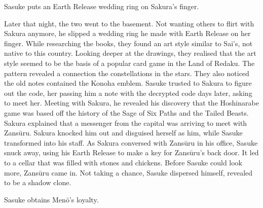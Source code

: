 \documentclass[a4paper,12pt]{article}
\begin{document}
Sasuke puts an Earth Release wedding ring on Sakura's finger.\\ \par \vspace{0.5cm}

Later that night, the two went to the basement. Not wanting others to flirt with Sakura anymore, he slipped a wedding ring he made with Earth Release on her finger. While researching the books, they found an art style similar to Sai's, not native to this country. Looking deeper at the drawings, they realised that the art style seemed to be the basis of a popular card game in the Land of Redaku. The pattern revealed a connection the constellations in the stars. They also noticed the old notes contained the Konoha emblem. Sasuke trusted to Sakura to figure out the code, her passing him a note with the decrypted code days later, asking to meet her. Meeting with Sakura, he revealed his discovery that the Hoshinarabe game was based off the history of the Sage of Six Paths and the Tailed Beasts. Sakura explained that a messenger from the capital was arriving to meet with Zansūru. Sakura knocked him out and disguised herself as him, while Sasuke transformed into his staff. As Sakura conversed with Zansūru in his office, Sasuke snuck away, using his Earth Release to make a key for Zansūru's back door. It led to a cellar that was filled with stones and chickens. Before Sasuke could look more, Zansūru came in. Not taking a chance, Sasuke dispersed himself, revealed to be a shadow clone.\\ \par \vspace{0.5cm}

Sasuke obtains Menō's loyalty.\\ \par \vspace{0.5cm}
\end{document}
